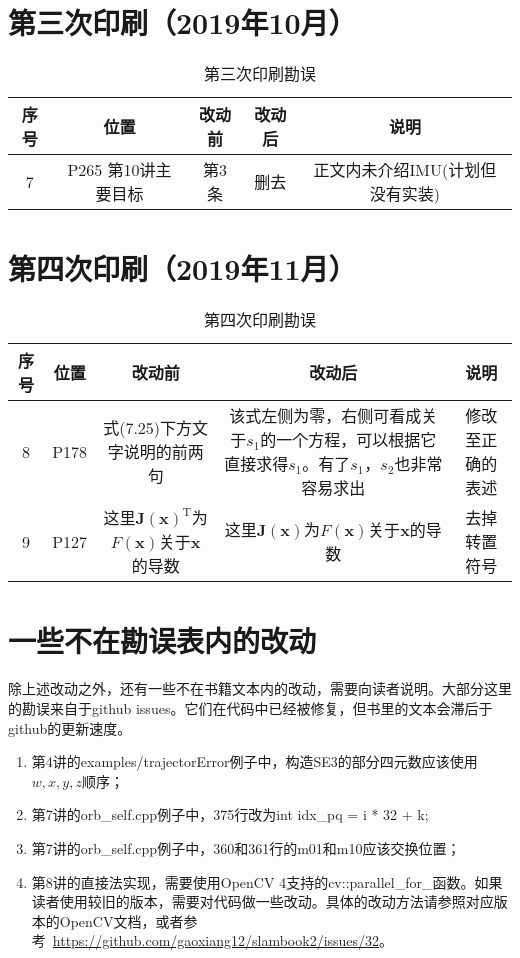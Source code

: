 \documentclass[lang=cn,11pt,numbers]{errata}
\begin{document}
\section{第三次印刷（2019年10月）}
\begin{table}[!htp]
	\centering
	\caption{第三次印刷勘误}
	\begin{tabular}{c|cccc}
		\hline\hline
		序号 & 位置 & 改动前 & 改动后 & 说明 \\\hline
		7 & P265 第10讲主要目标 & 第3条 & 删去 & 正文内未介绍IMU(计划但没有实装) \\
		\hline \hline
	\end{tabular}
\end{table}

\section{第四次印刷（2019年11月）}
\begin{table}[!htp]
	\centering
	\caption{第四次印刷勘误}
	\begin{tabular}{c|cccc}
		\hline\hline
		序号 & 位置 & 改动前 & 改动后 & 说明 \\\hline
		8 & P178  & 式(7.25)下方文字说明的前两句 & 该式左侧为零，右侧可看成关于$s_1$的一个方程，可以根据它直接求得$s_1$。有了$s_1$，$s_2$也非常容易求出 & 修改至正确的表述 \\
		\hline \hline
        9 & P127  & 这里$\bm{J}(\bm{x})^\mathrm{T}$为$F(\bm{x})$关于$\bm{x}$的导数 & 这里$\bm{J}(\bm{x})$为$F(\bm{x})$关于$\bm{x}$的导数 & 去掉转置符号 \\
        \hline \hline
	\end{tabular}
\end{table}

\section{一些不在勘误表内的改动}
除上述改动之外，还有一些不在书籍文本内的改动，需要向读者说明。大部分这里的勘误来自于github issues。它们在代码中已经被修复，但书里的文本会滞后于github的更新速度。

\begin{enumerate}
	\item 第4讲的examples/trajectorError例子中，构造SE3的部分四元数应该使用$w,x,y,z$顺序；
	\item 第7讲的orb\_self.cpp例子中，375行改为int idx\_pq = i * 32 + k;
    \item 第7讲的orb\_self.cpp例子中，360和361行的m01和m10应该交换位置；
	\item 第8讲的直接法实现，需要使用OpenCV 4支持的cv::parallel\_for\_函数。如果读者使用较旧的版本，需要对代码做一些改动。具体的改动方法请参照对应版本的OpenCV文档，或者参考~\url{https://github.com/gaoxiang12/slambook2/issues/32}。

\end{enumerate}
\end{document}
